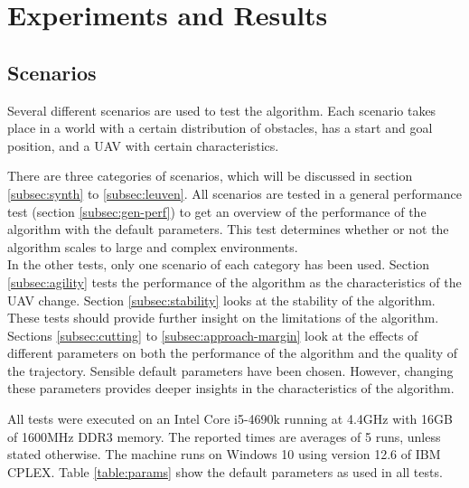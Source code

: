 \section{Experiments and Results}
\label{section:analysis}

\subsection{Scenarios}
Several different scenarios are used to test the algorithm. Each scenario takes place in a world with a certain distribution of obstacles, has a start and goal position, and a UAV with certain characteristics.
\par
There are three categories of scenarios, which will be discussed in section \ref{subsec:synth} to \ref{subsec:leuven}. All scenarios are tested in a general performance test (section \ref{subsec:gen-perf}) to get an overview of the performance of the algorithm with the default parameters. This test determines whether or not the algorithm scales to large and complex environments.\\
In the other tests, only one scenario of each category has been used. Section \ref{subsec:agility} tests the performance of the algorithm as the characteristics of the UAV change. Section \ref{subsec:stability} looks at the stability of the algorithm. These tests should provide further insight on the limitations of the algorithm.\\

Sections \ref{subsec:cutting} to \ref{subsec:approach-margin} look at the effects of different parameters on both the performance of the algorithm and the quality of the trajectory. Sensible default parameters have been chosen. However, changing these parameters provides deeper insights in the characteristics of the algorithm.

All tests were executed on an Intel Core i5-4690k running at 4.4GHz with 16GB of 1600MHz DDR3 memory. The reported times are averages of 5 runs, unless stated otherwise. The machine runs on Windows 10 using version 12.6 of IBM CPLEX. Table \ref{table:params} show the default parameters as used in all tests.

